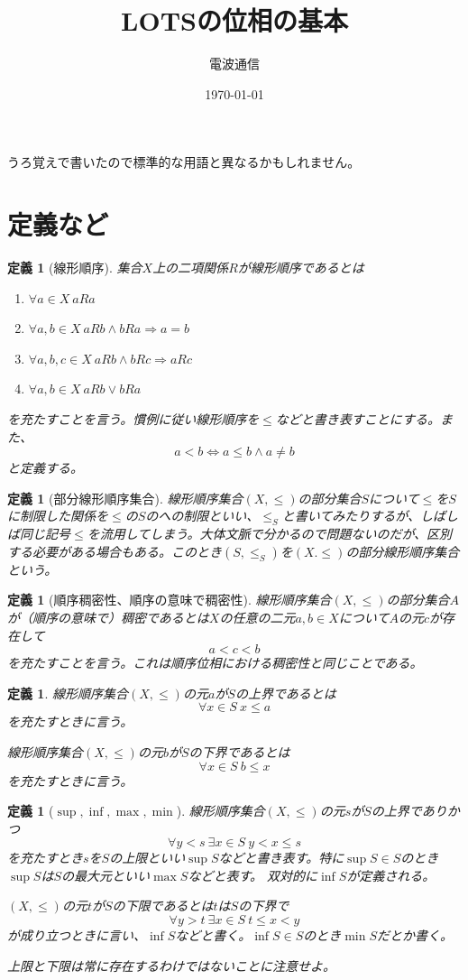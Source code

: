 \documentclass[leqno]{jsarticle}
\title{LOTSの位相の基本}
\author{電波通信}
\date{\today}
\newtheorem{df}[thm]{定義}
\newcommand{\To}{\Longrightarrow}
\begin{document}
\maketitle
うろ覚えで書いたので標準的な用語と異なるかもしれません。
\section{定義など}
\begin{df}[線形順序]
集合$X$上の二項関係$R$が線形順序であるとは
\begin{enumerate}
\item $\forall a\in X\ aRa$
\item $\forall a, b\in X\ aRb\land bRa\To a=b$
\item $\forall a,b,c\in X\ aRb\land bRc\To aRc$
\item $\forall a,b\in X\ aRb\lor bRa$
\end{enumerate}
を充たすことを言う。慣例に従い線形順序を$\le$などと書き表すことにする。また、
\[
a<b\iff a\le b \land a\neq b
\]
と定義する。
\end{df}

\begin{df}[部分線形順序集合]
線形順序集合$(X,\le)$の部分集合$S$について$\le$を$S$に制限した関係を$\le $の$S$のへの制限といい、$\le_S$と書いてみたりするが、しばしば同じ記号$\le$を流用してしまう。大体文脈で分かるので問題ないのだが、区別する必要がある場合もある。このとき$(S,\le_S)$を$(X.\le)$の部分線形順序集合という。
\end{df}

\begin{df}[順序稠密性、順序の意味で稠密性]
線形順序集合$(X,\le )$の部分集合$A$が（順序の意味で）稠密であるとは$X$の任意の二元$a,b\in X$について$A$の元$c$が存在して
\[
a<c<b
\]
を充たすことを言う。これは順序位相における稠密性と同じことである。
\end{df}
\begin{df}
線形順序集合$(X,\le )$の元$a$が$S$の上界であるとは
\[
\forall x\in S\ x\le a
\]
を充たすときに言う。\par
線形順序集合$(X,\le )$の元$b$が$S$の下界であるとは
\[
\forall x\in S\ b \le x
\]
を充たすときに言う。
\end{df}

\begin{df}[$\sup, \inf, \max, \min$]
線形順序集合$(X,\le )$の元$s$が$S$の上界でありかつ
\[
\forall y<s\ \exists x\in S\ y<x\le s
\]
を充たすとき$s$を$S$の上限といい$\sup S$などと書き表す。特に$\sup S\in S$のとき$\sup S$は$S$の最大元といい$\max S$などと表す。
双対的に$\inf S$が定義される。\par
$(X,\le)$の元$t$が$S$の下限であるとは$t$は$S$の下界で
\[
\forall y>t\ \exists x\in S\ t\le x<y
\]
が成り立つときに言い、$\inf S$などと書く。$\inf S\in S$のとき$\min S$だとか書く。\par
上限と下限は常に存在するわけではないことに注意せよ。
\end{df}
\end{document}
